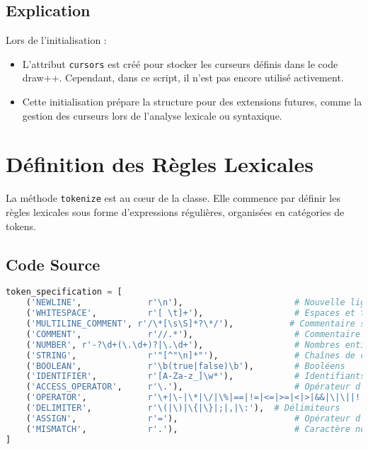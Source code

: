 \documentclass[12pt]{article}
\begin{document}
\subsection*{Explication}
Lors de l'initialisation :
\begin{itemize}
    \item L'attribut \texttt{cursors} est créé pour stocker les curseurs définis dans le code draw++. Cependant, dans ce script, il n'est pas encore utilisé activement.
    \item Cette initialisation prépare la structure pour des extensions futures, comme la gestion des curseurs lors de l'analyse lexicale ou syntaxique.
\end{itemize}

\section{Définition des Règles Lexicales}
La méthode \texttt{tokenize} est au cœur de la classe. Elle commence par définir les règles lexicales sous forme d'expressions régulières, organisées en catégories de tokens.

\subsection*{Code Source}
\begin{lstlisting}[language=Python, caption={Définition des règles lexicales pour draw++}]
token_specification = [
    ('NEWLINE',             r'\n'),                      # Nouvelle ligne
    ('WHITESPACE',          r'[ \t]+'),                  # Espaces et tabulations
    ('MULTILINE_COMMENT', r'/\*[\s\S]*?\*/'),           # Commentaire sur plusieurs lignes
    ('COMMENT',             r'//.*'),                    # Commentaire sur une ligne
    ('NUMBER', r'-?\d+(\.\d+)?|\.\d+'),                  # Nombres entiers ou décimaux
    ('STRING',              r'"[^"\n]*"'),               # Chaînes de caractères
    ('BOOLEAN',             r'\b(true|false)\b'),        # Booléens
    ('IDENTIFIER',          r'[A-Za-z_]\w*'),            # Identifiants
    ('ACCESS_OPERATOR',     r'\.'),                      # Opérateur d'accès
    ('OPERATOR',            r'\+|\-|\*|\/|\%|==|!=|<=|>=|<|>|&&|\|\||!'),
    ('DELIMITER',           r'\(|\)|\{|\}|;|,|\:'),  # Délimiteurs
    ('ASSIGN',              r'='),                       # Opérateur d'affectation
    ('MISMATCH',            r'.'),                       # Caractère non reconnu
]
\end{lstlisting}
\end{document}
